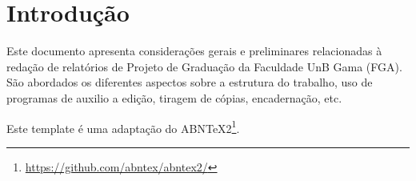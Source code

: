 \chapter*[Introdução]{Introdução}

Este documento apresenta considerações gerais e preliminares relacionadas 
à redação de relatórios de Projeto de Graduação da Faculdade UnB Gama 
(FGA). São abordados os diferentes aspectos sobre a estrutura do trabalho, 
uso de programas de auxilio a edição, tiragem de cópias, encadernação, etc.

Este template é uma adaptação do ABNTeX2\footnote{\url{https://github.com/abntex/abntex2/}}.




